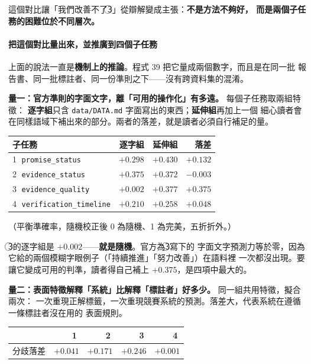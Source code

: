 \documentclass[11pt,a4paper]{ctexart}
\newcommand{\fn}[1]{\texttt{#1}}
\begin{document}
\begin{tcolorbox}[colback=blue!5, colframe=blue!55]
這個對比讓「我們改善不了\textcircled{3}」從辯解變成主張：\textbf{不是方法不夠好，
而是兩個子任務的困難位於不同層次。}
\end{tcolorbox}

\paragraph{把這個對比量出來，並推廣到四個子任務}
\label{sec:crosstask}

上面的說法一直是\textbf{機制上的推論}。程式 39 把它量成兩個數字，而且是在同一批
報告書、同一批標註者、同一份準則之下——沒有跨資料集的混淆。

\medskip
\textbf{量一：官方準則的字面文字，離「可用的操作化」有多遠。} 每個子任務取兩組特徵：
\textbf{逐字組}只含 \texttt{data/DATA.md} 字面寫出的東西；\textbf{延伸組}再加上一個
細心讀者會在同樣語域下補出來的部分。兩者的落差，就是讀者必須自行補足的量。

\begin{table}[h]
\centering\small
\begin{tabular}{@{}lrrr@{}}
\toprule
子任務 & 逐字組 & 延伸組 & 落差 \\
\midrule
\textcircled{1} \fn{promise\_status} & $+0.298$ & $+0.430$ & $+0.132$ \\
\textcircled{2} \fn{evidence\_status} & $+0.375$ & $+0.372$ & $-0.003$ \\
\rowcolor{yellow!15}
\textcircled{3} \fn{evidence\_quality} & $\mathbf{+0.002}$ & $+0.377$ & $\mathbf{+0.375}$ \\
\textcircled{4} \fn{verification\_timeline} & $+0.210$ & $+0.258$ & $+0.048$ \\
\bottomrule
\end{tabular}
\end{table}

（平衡準確率，隨機校正後 0 為隨機、1 為完美，五折折外。）

\textcircled{3}的逐字組是 $+0.002$——\textbf{就是隨機}。官方為\textcircled{3}寫下的
字面文字預測力等於零，因為它給的兩個模糊字眼例子（「持續推進」「努力改善」）在語料裡
一次都沒出現。要讓它變成可用的判準，讀者得自己補上 $+0.375$，是四項中最大的。

\medskip
\textbf{量二：表面特徵解釋「系統」比解釋「標註者」好多少。} 同一組共用特徵，擬合兩次：
一次重現正解標籤，一次重現競賽系統的預測。落差大，代表系統在遵循一條標註者沒在用的
表面規則。

\begin{table}[h]
\centering\small
\begin{tabular}{@{}lrrrr@{}}
\toprule
 & \textcircled{1} & \textcircled{2} & \textcircled{3} & \textcircled{4} \\
\midrule
分歧落差 & $+0.041$ & $+0.171$ & $\mathbf{+0.246}$ & $\mathbf{+0.001}$ \\
\bottomrule
\end{tabular}
\end{table}
\end{document}
